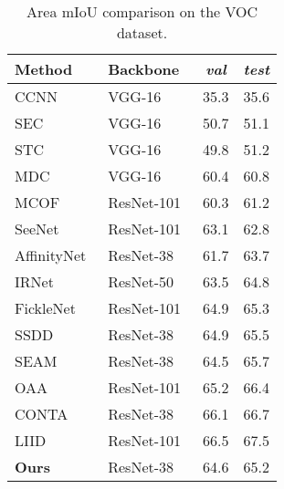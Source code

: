 \documentclass{article}
\begin{document}
\begin{table}[p]
	\setlength\abovecaptionskip{0pt}
	\centering
	\caption{Area mIoU comparison on the VOC dataset.}
	\begin{tabular}[t]{llcc}
		\toprule
		Method                             & Backbone   & \textit{val} & \textit{test} \\
		\midrule
		CCNN~\cite{pathak2015iccv}         & VGG-16~\cite{simonyan2015iclr} & 35.3         & 35.6          \\
SEC~\cite{kolesnikov2016eccv}      & VGG-16~\cite{simonyan2015iclr} & 50.7         & 51.1          \\
		STC~\cite{wei2016tpami}            & VGG-16~\cite{simonyan2015iclr} & 49.8         & 51.2          \\
MDC~\cite{wei2018cvpr}             & VGG-16~\cite{simonyan2015iclr} & 60.4         & 60.8          \\
		MCOF~\cite{wang2018cvpr}           & ResNet-101~\cite{he2016cvpr}   & 60.3         & 61.2          \\
SeeNet~\cite{hou2018neurips}       & ResNet-101~\cite{he2016cvpr}   & 63.1         & 62.8          \\
AffinityNet~\cite{ahn2018cvpr}     & ResNet-38~\cite{wu2019pr}      & 61.7         & 63.7          \\
		IRNet~\cite{ahn2019cvpr}           & ResNet-50~\cite{he2016cvpr}    & 63.5         & 64.8          \\
FickleNet~\cite{lee2019cvpr}       & ResNet-101~\cite{he2016cvpr}   & 64.9         & 65.3          \\
		SSDD~\cite{shimoda2019iccv}        & ResNet-38~\cite{wu2019pr}      & 64.9         & 65.5          \\
		SEAM~\cite{wang2020cvpr}           & ResNet-38~\cite{wu2019pr}      & 64.5         & 65.7          \\
		OAA~\cite{jiang2019iccv}           & ResNet-101~\cite{he2016cvpr}   & 65.2         & 66.4          \\
		CONTA~\cite{zhang2020neurips}      & ResNet-38~\cite{wu2019pr}      & 66.1         & 66.7          \\
		LIID~\cite{liu2020tpami}           & ResNet-101~\cite{he2016cvpr}   & 66.5         & 67.5          \\
		\midrule
		\textbf{Ours}                      & ResNet-38~\cite{wu2019pr}      & 64.6         & 65.2          \\
		\bottomrule
	\end{tabular}
	\label{table_sota}
\end{table}
\end{document}
